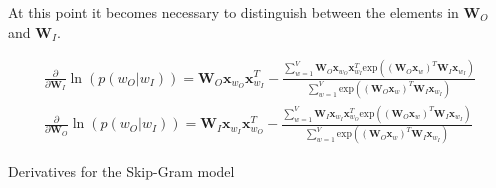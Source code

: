 At this point it becomes necessary to distinguish between the elements in $\mathbf{W}_O$ and $\mathbf{W}_I$.

\begin{equationbox}[H]
\begin{equation*}
\begin{aligned}
\frac{\partial}{\partial \mathbf{W}_I} \ln( p(w_O | w_I) ) = \mathbf{W}_O \mathbf{x}_{w_O} \mathbf{x}_{w_I}^T - \frac{
	\sum_{w=1}^V \mathbf{W}_O \mathbf{x}_{w_O} \mathbf{x}_{w_I}^T \mathrm{exp}( \left( \mathbf{W}_O \mathbf{x}_{w} \right)^T \mathbf{W}_I \mathbf{x}_{w_I})
} {
	\sum_{w=1}^V \mathrm{exp}( \left( \mathbf{W}_O \mathbf{x}_{w} \right)^T \mathbf{W}_I \mathbf{x}_{w_I})
} \\
\frac{\partial}{\partial \mathbf{W}_O} \ln( p(w_O | w_I) ) = \mathbf{W}_I \mathbf{x}_{w_I} \mathbf{x}_{w_O}^T - \frac{
	\sum_{w=1}^V \mathbf{W}_I \mathbf{x}_{w_I} \mathbf{x}_{w_O}^T \mathrm{exp}( \left( \mathbf{W}_O \mathbf{x}_{w} \right)^T \mathbf{W}_I \mathbf{x}_{w_I})
} {
	\sum_{w=1}^V \mathrm{exp}( \left( \mathbf{W}_O \mathbf{x}_{w} \right)^T \mathbf{W}_I \mathbf{x}_{w_I})
}
\end{aligned}
\end{equation*}
\caption{Derivatives for the Skip-Gram model}
\end{equationbox}

